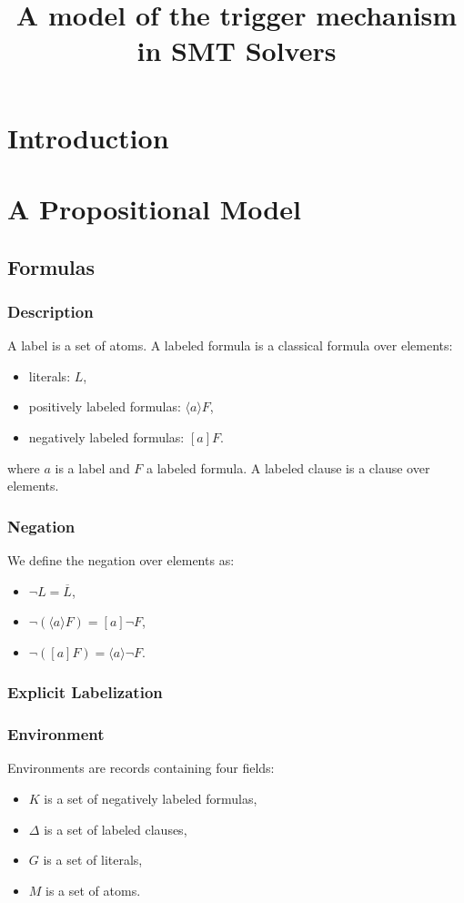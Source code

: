 \documentclass[a4paper,11pt]{article}
\title{A model of the trigger mechanism in SMT Solvers}
\author{}
\begin{document}
\maketitle

\begin{abstract}

\end{abstract}

\section{Introduction}
\section{A Propositional Model}
\subsection{Formulas}
\subsubsection{Description}
A label is a set of atoms.
A labeled formula is a classical formula over elements:
\begin{itemize}
 \item literals: $L$,
 \item positively labeled formulas: $\langle a\rangle F$,
 \item negatively labeled formulas: $[a]F$.
\end{itemize}
where $a$ is a label and $F$ a labeled formula. A labeled clause is a clause over
elements.
\subsubsection{Negation}
We define the negation over elements as:
\begin{itemize}
 \item $\neg L=\overline L$,
 \item $\neg(\langle a\rangle F)=[a]\neg F$,
 \item $\neg([a]F)=\langle a\rangle\neg F$.
\end{itemize}
\subsubsection{Explicit Labelization}
\subsubsection{Environment}
Environments are records containing four fields:
\begin{itemize}
 \item $K$ is a set of negatively labeled formulas,
 \item $\Delta$ is a set of labeled clauses,
 \item $G$ is a set of literals,
 \item $M$ is a set of atoms.
\end{itemize}
\end{document}
